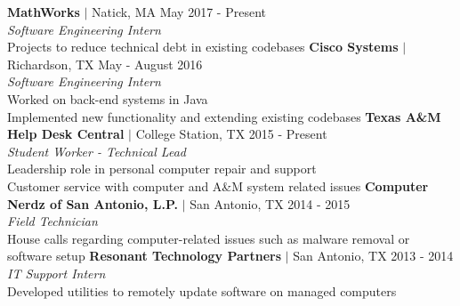 \documentclass[12pt]{article}
\begin{document}
\begin{flushleft}
\begin{outline}[compactitem]
  \1 \textbf{MathWorks} $|$ Natick, MA \hfill May 2017 - Present
  \\ \textit{Software Engineering Intern}
  \\ Projects to reduce technical debt in existing codebases
  \1 \textbf{Cisco Systems} $|$ Richardson, TX \hfill May - August 2016
  \\ \textit{Software Engineering Intern}
  \\ Worked on back-end systems in Java
  \\ Implemented new functionality and extending existing codebases
  \1 \textbf{Texas A\&M Help Desk Central} $|$ College Station, TX \hfill 2015 - Present
    \\ \textit{Student Worker - Technical Lead}
    \\ Leadership role in personal computer repair and support
    \\ Customer service with  computer and A\&M system related issues
  \1 \textbf{Computer Nerdz of San Antonio, L.P.} $|$ San Antonio, TX \hfill 2014 - 2015
    \\ \textit{Field Technician}
    \\ House calls regarding computer-related issues such as malware removal or software setup
  \1 \textbf{Resonant Technology Partners} $|$ San Antonio, TX \hfill 2013 - 2014
    \\ \textit{IT Support Intern}
    \\ Developed utilities to remotely update software on managed computers


\end{outline}
\end{flushleft}
\end{document}

